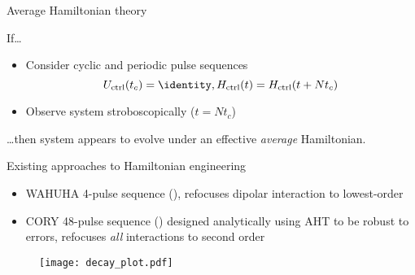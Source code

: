 \documentclass{beamer}
\begin{document}
\begin{frame}{Average Hamiltonian theory}

If\dots
\begin{itemize}
    \item Consider cyclic and periodic pulse sequences
    \[
    U_{\text{ctrl}}(t_c) = \identity, H_{\text{ctrl}}(t) = H_{\text{ctrl}}(t + Nt_c)
    \]
    \item Observe system stroboscopically ($t = Nt_c$)
\end{itemize}
\dots then system appears to evolve under an effective \emph{average} Hamiltonian.

\begin{figure}
\centering
\scalebox{.7}{

}
\end{figure}


\end{frame}

\begin{frame}{Existing approaches to Hamiltonian engineering}

\begin{itemize}
    \item WAHUHA 4-pulse sequence (\cite{PhysRevLett.20.180}), refocuses dipolar interaction to lowest-order

    \item CORY 48-pulse sequence (\cite{CORY1990205}) designed analytically using AHT to be robust to errors, refocuses \emph{all} interactions to second order
\end{itemize}

\begin{figure}
\centering
\texttt{[image: decay\_plot.pdf]}
\end{figure}


\end{frame}
\end{document}
